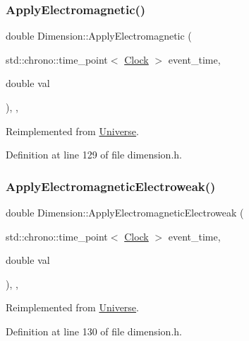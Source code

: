 \subsubsection{\texorpdfstring{Apply\+Electromagnetic()}{ApplyElectromagnetic()}}
{\footnotesize\ttfamily double Dimension\+::\+Apply\+Electromagnetic (\begin{DoxyParamCaption}\item[{std\+::chrono\+::time\+\_\+point$<$ \hyperlink{universe_8h_a0ef8d951d1ca5ab3cfaf7ab4c7a6fd80}{Clock} $>$}]{event\+\_\+time,  }\item[{double}]{val }\end{DoxyParamCaption})\hspace{0.3cm}{\ttfamily [inline]}, {\ttfamily [final]}, {\ttfamily [virtual]}}



Reimplemented from \hyperlink{class_universe_a1f787da78fa196ba635db21a9e91dabb}{Universe}.



Definition at line 129 of file dimension.\+h.

\mbox{\label{class_dimension_ab13e8ed50a4373274636e542c917db01}} 
\subsubsection{\texorpdfstring{Apply\+Electromagnetic\+Electroweak()}{ApplyElectromagneticElectroweak()}}
{\footnotesize\ttfamily double Dimension\+::\+Apply\+Electromagnetic\+Electroweak (\begin{DoxyParamCaption}\item[{std\+::chrono\+::time\+\_\+point$<$ \hyperlink{universe_8h_a0ef8d951d1ca5ab3cfaf7ab4c7a6fd80}{Clock} $>$}]{event\+\_\+time,  }\item[{double}]{val }\end{DoxyParamCaption})\hspace{0.3cm}{\ttfamily [inline]}, {\ttfamily [final]}, {\ttfamily [virtual]}}



Reimplemented from \hyperlink{class_universe_a4c36c1ab30db993307f88363dde5e8c5}{Universe}.



Definition at line 130 of file dimension.\+h.

